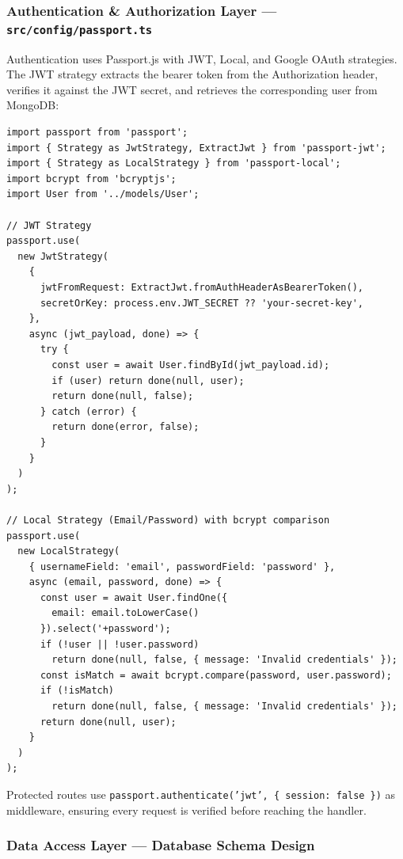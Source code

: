 \documentclass[12pt,letterpaper]{article}
\begin{document}
\newpage

\subsubsection{Authentication \& Authorization Layer --- \texttt{src/config/passport.ts}}

Authentication uses Passport.js with JWT, Local, and Google OAuth strategies. The JWT strategy extracts the bearer token from the Authorization header, verifies it against the JWT secret, and retrieves the corresponding user from MongoDB:

\begin{lstlisting}[caption={Passport.js authentication strategies (\texttt{passport.ts})}]
import passport from 'passport';
import { Strategy as JwtStrategy, ExtractJwt } from 'passport-jwt';
import { Strategy as LocalStrategy } from 'passport-local';
import bcrypt from 'bcryptjs';
import User from '../models/User';

// JWT Strategy
passport.use(
  new JwtStrategy(
    {
      jwtFromRequest: ExtractJwt.fromAuthHeaderAsBearerToken(),
      secretOrKey: process.env.JWT_SECRET ?? 'your-secret-key',
    },
    async (jwt_payload, done) => {
      try {
        const user = await User.findById(jwt_payload.id);
        if (user) return done(null, user);
        return done(null, false);
      } catch (error) {
        return done(error, false);
      }
    }
  )
);

// Local Strategy (Email/Password) with bcrypt comparison
passport.use(
  new LocalStrategy(
    { usernameField: 'email', passwordField: 'password' },
    async (email, password, done) => {
      const user = await User.findOne({
        email: email.toLowerCase()
      }).select('+password');
      if (!user || !user.password)
        return done(null, false, { message: 'Invalid credentials' });
      const isMatch = await bcrypt.compare(password, user.password);
      if (!isMatch)
        return done(null, false, { message: 'Invalid credentials' });
      return done(null, user);
    }
  )
);
\end{lstlisting}

Protected routes use \texttt{passport.authenticate('jwt', \{ session: false \})} as middleware, ensuring every request is verified before reaching the handler.

\newpage

\subsubsection{Data Access Layer --- Database Schema Design}
\end{document}
